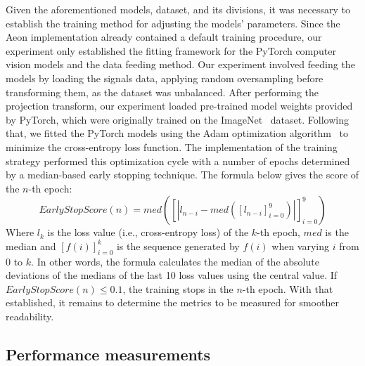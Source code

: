 Given the aforementioned models, dataset, and its divisions, it was necessary to establish the training method for adjusting the models' parameters. Since the Aeon implementation already contained a default training procedure, our experiment only established the fitting framework for the PyTorch computer vision models and the data feeding method. Our experiment involved feeding the models by loading the signals data, applying random oversampling before transforming them, as the dataset was unbalanced. After performing the projection transform, our experiment loaded pre-trained model weights provided by PyTorch, which were originally trained on the ImageNet~\cite{ImageNet} dataset. Following that, we fitted the PyTorch models using the Adam optimization algorithm~\cite{Adam} to minimize the cross-entropy loss function. The implementation of the training strategy performed this optimization cycle with a number of epochs determined by a median-based early stopping technique. The formula below gives the score of the $n$-th epoch:
\begin{equation}
EarlyStopScore(n) = med([|l_{n-i} - med([l_{n-i}]_{i=0}^9)|]_{i=0}^{9})
\end{equation}
\noindent Where $l_k$ is the loss value (i.e., cross-entropy loss) of the $k$-th epoch, ${med}$ is the median and $[f(i)]_{i=0}^k$ is the sequence generated by $f(i)$ when varying $i$ from $0$ to $k$. In other words, the formula calculates the median of the absolute deviations of the medians of the last 10 loss values using the central value. If $EarlyStopScore(n) \leq 0.1$, the training stops in the $n$-th epoch. With that established, it remains to determine the metrics to be measured for smoother readability.

\subsection{Performance measurements}

